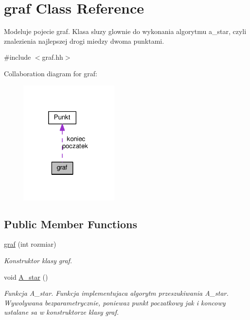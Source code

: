 \hypertarget{classgraf}{\section{graf Class Reference}
\label{classgraf}
}


Modeluje pojecie graf. Klasa sluzy glownie do wykonania algorytmu a\-\_\-star, czyli znalezienia najlepszej drogi miedzy dwoma punktami.  




{\ttfamily \#include $<$graf.\-hh$>$}



Collaboration diagram for graf\-:\nopagebreak
\begin{figure}[H]
\begin{center}
\leavevmode
\includegraphics[width=140pt]{classgraf__coll__graph}
\end{center}
\end{figure}
\subsection*{Public Member Functions}
\begin{DoxyCompactItemize}
\item 
\hyperlink{classgraf_ae13560d84bcbc72d6aa0a10e94e245b6}{graf} (int rozmiar)
\begin{DoxyCompactList}\small\item\em Konstruktor klasy graf. \end{DoxyCompactList}\item 
void \hyperlink{classgraf_a0ccf7a033759840d0b63c9ab1eac79c3}{A\-\_\-star} ()
\begin{DoxyCompactList}\small\item\em Funkcja A\-\_\-star. Funkcja implementujaca algorytm przeszukiwania A\-\_\-star. Wywolywana bezparametrycznie, poniewaz punkt poczatkowy jak i koncowy ustalane sa w konstruktorze klasy graf. \end{DoxyCompactList}\end{DoxyCompactItemize}

